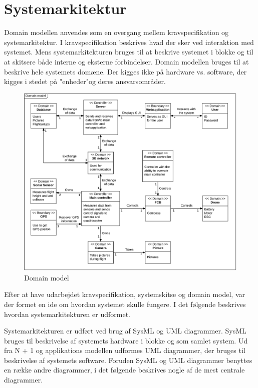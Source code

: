 \section{Systemarkitektur}
\label{chap:systemarkitektur}

Domain modellen anvendes som en overgang mellem kravspecifikation og systemarkitektur.
I kravspecifikation beskrives hvad der sker ved interaktion med systemet. Mens
systemarkitekturen bruges til at beskrive systemet i blokke og til at skitsere både interne
og eksterne forbindelser. Domain modellen bruges til at beskrive hele systemets domæne.
Der kigges ikke på hardware vs. software, der kigges i stedet på "enheder"og deres
ansvarsområder.\\

\begin{figure}[H]
	\centering
	\includegraphics[width=1\textwidth]{Billeder/domain_model.png}
	\caption{Domain model}
	\label{fig:domain}
\end{figure}


\newpage

Efter at have udarbejdet kravspecifikation, systemskitse og domain model, var der formet en ide om hvordan systemet skulle fungere. I det følgende beskrives hvordan systemarkitekturen er udformet. 


Systemarkitekturen er udført ved brug af SysML og UML diagrammer. 
SysML bruges til beskrivelse af systemets hardware i blokke og som samlet system. Ud fra N + 1 og applikations modellen udformes UML diagrammer, der bruges til beskrivelse af systemets software. 
Foruden SysML og UML diagrammer benyttes en række andre diagrammer, i det følgende beskrives nogle af de mest centrale diagrammer.\\


